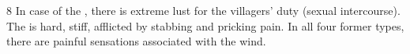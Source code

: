 \begin{translation}
\item [8] In case of the , there is extreme lust for the villagers' duty (sexual intercourse).
The  is hard, stiff, afflicted by stabbing and pricking pain.
In all four former types, there are painful sensations associated with the wind.
\end{translation}
